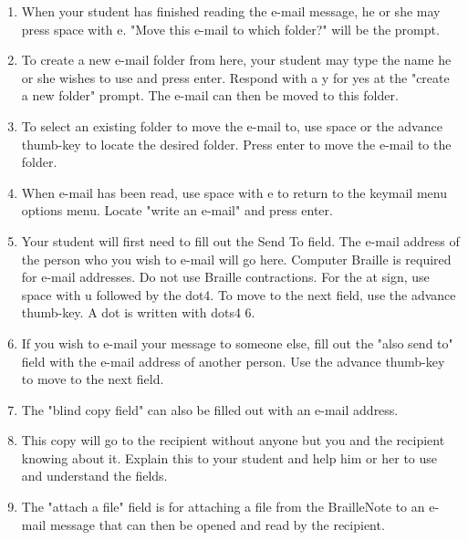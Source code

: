 \documentclass[10pt,letterpaper,twoside]{report}
\begin{document}
{{{{\begin{enumerate}
\begin{enumerate}
		      \item Stop the display from automatically moving by pressing previous and next together.
		            
		            
	      \end{enumerate}
	\item When your student has finished reading the e-mail message, he or she may press space with e.  "Move this e-mail to which folder?" will be the prompt.
	      
	\item To create a new e-mail folder from here, your student may type the name he or she wishes to use and press enter.  Respond with a y for yes at the "create a new folder" prompt.  The e-mail can then be moved to this folder.
	      
	\item To select an existing folder to move the e-mail to, use space or the advance thumb-key to locate the desired folder.  Press enter to move the e-mail to the folder.
	      
	\item When e-mail has been read, use space with e to return to the keymail menu options menu.  Locate "write an e-mail" and press enter.
	      
	\item Your student will first need to fill out the Send To field.  The e-mail address of the person who you wish to e-mail will go here.  Computer Braille is required for e-mail addresses.  Do not use Braille contractions.  For the at sign, use space with u followed by the dot4. To move to the next field, use the advance thumb-key. A dot is written with dots4 6.
	      
	\item If you wish to e-mail your message to someone else, fill out the "also send to" field with the e-mail address of another person.  Use the advance thumb-key to move to the next field.
	      
	\item The "blind copy field" can also be filled out with an e-mail address.
	      
	\item This copy will go to the recipient without anyone but you and the recipient knowing about it.  Explain this to your student and help him or her to use and understand the fields.
	      
	\item The "attach a file" field is for attaching a file from the BrailleNote to an e-mail message that can then be opened and read by the recipient.
	      

\end{enumerate}}}}}
\end{document}
